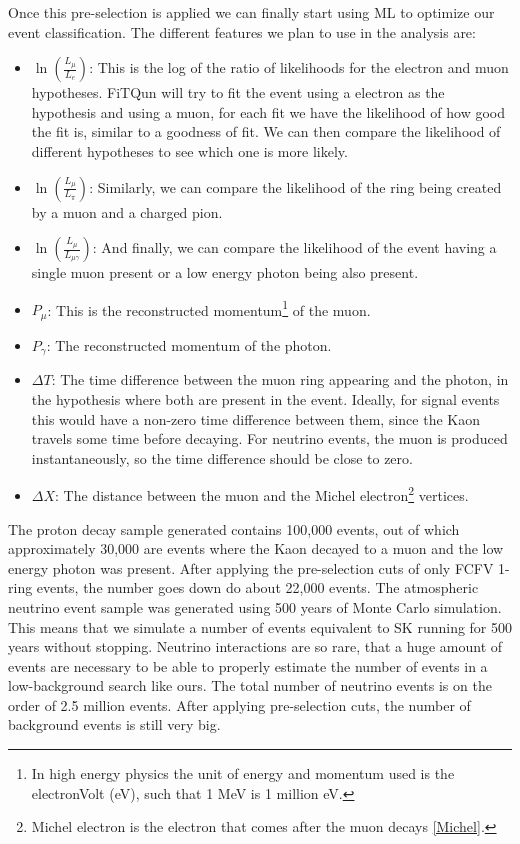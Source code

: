 Once this pre-selection is applied we can finally start using ML to optimize our event classification. The different features we plan to use in the analysis are:
\begin{itemize}  
\item  $\ln{\left(\frac{L_{\mu}}{L_{e}}\right)}$: This is the log of the ratio of likelihoods for the electron and muon hypotheses. FiTQun will try to fit the event using a electron as the hypothesis and using a muon, for each fit we have the likelihood of how good the fit is, similar to a goodness of fit. We can then compare the likelihood of different hypotheses to see which one is more likely.
\item  $\ln{\left(\frac{L_{\mu}}{L_{\pi}}\right)}$: Similarly, we can compare the likelihood of the ring being created by a muon and a charged pion.
\item  $\ln{\left(\frac{L_{\mu}}{L_{\mu\gamma}}\right)}$: And finally, we can compare the likelihood of the event having a single muon present or a low energy photon being also present.
\item $P_{\mu}$: This is the reconstructed momentum\footnote{In high energy physics the unit of energy and momentum used is the electronVolt (eV), such that 1 MeV is 1 million eV.} of the muon.
\item $P_{\gamma}$: The reconstructed momentum of the photon.
\item $\Delta T$: The time difference between the muon ring appearing and the photon, in the hypothesis where both are present in the event. Ideally, for signal events this would have a non-zero time difference between them, since the Kaon travels some time before decaying. For neutrino events, the muon is produced instantaneously, so the time difference should be close to zero.
\item  $\Delta X$: The distance between the muon and the Michel electron\footnote{Michel electron is the electron that comes after the muon decays \ref{Michel}.} vertices. 
\end{itemize}

The proton decay sample generated contains 100,000 events, out of which approximately 30,000 are events where the Kaon decayed to a muon and the low energy photon was present. After applying the pre-selection cuts of only FCFV 1-ring events, the number goes down do about 22,000 events.
The atmospheric neutrino event sample was generated using 500 years of Monte Carlo simulation. This means that we simulate a number of events equivalent to SK running for 500 years without stopping. Neutrino interactions are so rare, that a huge amount of events are necessary to be able to properly estimate the number of events in a low-background search like ours. The total number of neutrino events is on the order of 2.5 million events. After applying pre-selection cuts, the number of background events is still very big.

